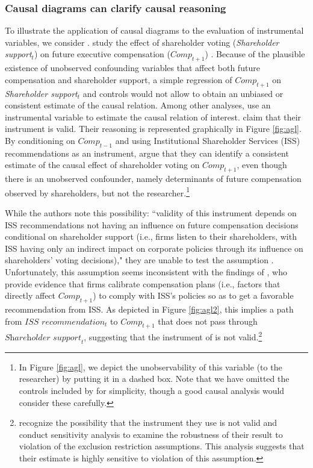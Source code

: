 \documentclass[12pt,reqno,titlepage]{amsart}
\theoremstyle{definition}
\begin{document}
\begin{doublespace}
\subsubsection{Causal diagrams can clarify causal reasoning}
To illustrate the application of causal diagrams to the evaluation of instrumental variables, we consider \citet{Armstrong:2013io}.
\citet{Armstrong:2013io} study the effect of shareholder voting (\textit{Shareholder support}$_{t}$) on future executive compensation ($\textit{Comp}_{t+1}$) .
Because of the plausible existence of unobserved confounding variables that affect both future compensation and shareholder support, a simple regression of $\textit{Comp}_{t+1}$ on \textit{Shareholder support}$_{t}$ and controls would not allow \citet{Armstrong:2013io} to obtain an unbiased or consistent estimate of the causal relation.
Among other analyses, \citet{Armstrong:2013io} use an instrumental variable to estimate the causal relation of interest.
\citet{Armstrong:2013io} claim that their instrument is valid. Their reasoning is represented graphically in Figure \ref{fig:agl}.
By conditioning on $\textit{Comp}_{t-1}$ and using Institutional Shareholder Services (ISS) recommendations as an instrument, \citet{Armstrong:2013io} argue that they can identify a consistent estimate of the causal effect of shareholder voting on $\textit{Comp}_{t+1}$, even though there is an unobserved confounder, namely determinants of future compensation observed by shareholders, but not the researcher.\footnote{
In Figure \ref{fig:agl}, we depict the unobservability of this variable (to the researcher) by putting it in a dashed box.
Note that we have omitted the controls included by \citet{Armstrong:2013io} for simplicity, though a good causal analysis would consider these carefully.}

While the authors note this possibility: ``validity of this instrument depends on ISS recommendations not having an influence on future compensation decisions conditional on shareholder support (i.e., firms listen to their shareholders, with ISS having only an indirect impact on corporate policies through its influence on shareholders' voting decisions)," they are unable to test the assumption \citep[p.\,912]{Armstrong:2013io}.
Unfortunately, this assumption seems inconsistent with the findings of \citet{Gow:2013aa}, who provide evidence that firms calibrate compensation plans (i.e., factors that directly affect $\textit{Comp}_{t+1}$) to comply with ISS's policies so as to get a favorable recommendation from ISS. 
As depicted in Figure \ref{fig:agl2}, this implies a path from $\textit{ISS recommendation}_t$ to $\textit{Comp}_{t+1}$ that does not pass through $\textit{Shareholder support}_{t}$, suggesting that the instrument of \citet[p.\,912]{Armstrong:2013io} is not valid.\footnote{\citet{Armstrong:2013io} recognize the possibility that the instrument they use is not valid and conduct sensitivity analysis to examine the robustness of their result to violation of the exclusion restriction assumptions. 
This analysis suggests that their estimate is highly sensitive to violation of this assumption.}


\end{doublespace}
\end{document}
